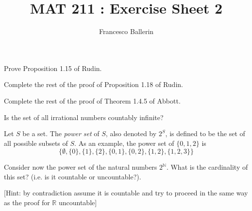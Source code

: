 \documentclass[11pt]{article}%
\title{MAT 211 : Exercise Sheet 2}
\author{Francesco Ballerin}
\date{\color{gray}{\small{francesco.ballerin@uib.no}}}
\begin{document}
\begin{minipage}[t]{\dimexpr \textwidth-6cm-\columnsep}
     \maketitle
\end{minipage}
\hfill\noindent{}

\vspace{50pt}

\begin{Exercise}[title=*]
	Prove Proposition 1.15 of Rudin.
\end{Exercise}

\begin{Exercise}[title=*]
	Complete the rest of the proof of Proposition 1.18 of Rudin.
\end{Exercise}

\begin{Exercise}[title=*]
	Complete the rest of the proof of Theorem 1.4.5 of Abbott.
\end{Exercise}

\begin{Exercise}[title=*]
	Is the set of all irrational numbers countably infinite?
\end{Exercise}

\begin{Exercise}[title=**$\dagger$]
	Let $S$ be a set. The \textit{power set} of $S$, also denoted by $2^{S}$, is defined to be the set of all possible subsets of $S$. As an example, the power set of $\{0,1,2\}$ is $$\{\emptyset,\{0\},\{1\},\{2\},\{0,1\},\{0,2\},\{1,2\},\{1,2,3\}\}$$
	
	Consider now the power set of the natural numbers $2^\mathbb N$. What is the cardinality of this set? (i.e. is it countable or uncountable?).
	
	\bigskip
	
	[Hint: by contradiction assume it is countable and try to proceed in the same way as the proof for $\mathbb R$ uncountable]
\end{Exercise}
\end{document}
